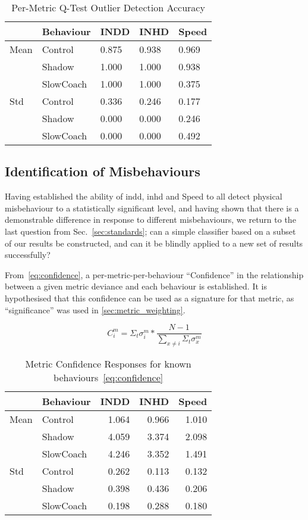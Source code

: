 \begin{table}
  \caption{Per-Metric Q-Test Outlier Detection Accuracy}
  \centering
\begin{tabular}{lllll}
\toprule
{} & Behaviour &  INDD &  INHD & Speed \\
\midrule
Mean & Control & 0.875 & 0.938 & 0.969 \\
     & Shadow & 1.000 & 1.000 & 0.938 \\
     & SlowCoach & 1.000 & 1.000 & 0.375 \\
Std & Control & 0.336 & 0.246 & 0.177 \\
     & Shadow & 0.000 & 0.000 & 0.246 \\
     & SlowCoach & 0.000 & 0.000 & 0.492 \\
\bottomrule
\end{tabular}
  \label{tab:per_metric_stats}
\end{table}

\subsection{Identification of Misbehaviours}
Having established the ability of \gls{indd}, \gls{inhd} and Speed to all detect physical misbehaviour to a statistically significant level, and having shown that there is a demonstrable difference in response to different misbehaviours, we return to the last question from Sec.~\ref{sec:standards}; can a simple classifier based on a subset of our results be constructed, and can it be blindly applied to a new set of results successfully?

From~\autoref{eq:confidence}, a per-metric-per-behaviour ``Confidence'' in the relationship between a given metric deviance and each behaviour is established. 
It is hypothesised that this confidence can be used as a signature for that metric, as ``significance'' was used in \autoref{sec:metric_weighting}.

\begin{equation}
C_{i}^{m} = \Sigma_t\sigma_{i}^m * \frac{N-1}{\sum_{x\neq i}{\Sigma_t\sigma_{x}^m}}\label{eq:confidence}
\end{equation}

\begin{table}[h]
  \caption{Metric Confidence Responses for known behaviours~\autoref{eq:confidence}}
  \centering
\begin{tabular}{llrrr}
\toprule
{} & Behaviour &  INDD &  INHD &  Speed \\
\midrule
Mean & Control & 1.064 & 0.966 &  1.010 \\
     & Shadow & 4.059 & 3.374 &  2.098 \\
     & SlowCoach & 4.246 & 3.352 &  1.491 \\
Std & Control & 0.262 & 0.113 &  0.132 \\
     & Shadow & 0.398 & 0.436 &  0.206 \\
     & SlowCoach & 0.198 & 0.288 &  0.180 \\
\bottomrule
\end{tabular}
  \label{tab:confidence}
\end{table}


